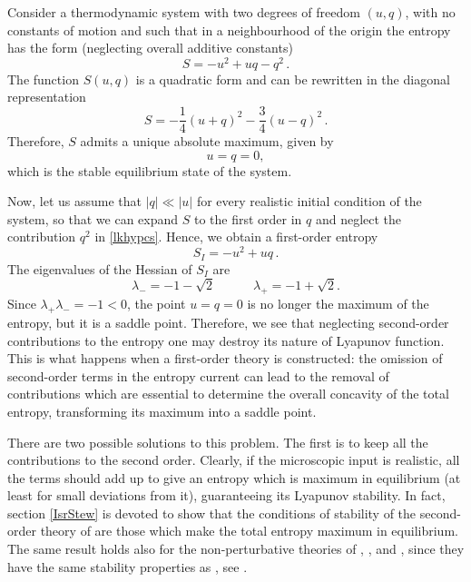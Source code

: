 \documentclass[a4paper, amsfonts, amssymb, amsmath, reprint, showkeys, nofootinbib, twoside]{revtex4-1}
\newcommand{\spc}{\quad \quad \quad}
\begin{document}
Consider a thermodynamic system with two degrees of freedom $(u,q)$, with no constants of motion and such that in a neighbourhood of the origin the entropy has the form (neglecting overall additive constants)
%
\begin{equation}\label{lkhypcs}
S = -u^2  +uq -q^2 \, .
\end{equation}
%
The function $S(u,q)$ is a quadratic form and can be rewritten in the diagonal representation
\begin{equation}
S = -\dfrac{1}{4} (u+q)^2 - \dfrac{3}{4}(u-q)^2 \, .
\end{equation} 
Therefore, $S$ admits a unique absolute maximum, given by
\begin{equation}
u=q=0,
\end{equation}
which is the stable equilibrium state of the system. 

Now,  let us assume  that  $|q| \ll |u|$ for every realistic initial condition of the system, 
so that we can expand $S$ to the first order in $q$ and neglect the contribution $q^2$ in \eqref{lkhypcs}. 
Hence, we obtain a first-order entropy
\begin{equation}
S_I = -u^2  +uq \, .
\end{equation}
The eigenvalues of the Hessian of $S_I $ are
\begin{equation}
\lambda_- =-1-\sqrt{2}  \spc  \lambda_+ = -1+\sqrt{2}.
\end{equation}
Since $\lambda_+ \lambda_- = -1<0$, the point $u=q=0$ is no longer the maximum of the entropy, but it is a saddle point. Therefore, we see that neglecting second-order contributions to the entropy one may destroy its nature of Lyapunov function. This is what happens when a first-order theory is constructed: the omission of second-order terms in the entropy current can lead to the removal of  contributions which are essential to determine the overall concavity of the total entropy, transforming its maximum into a saddle point.

There are two possible solutions to this problem. The first is to keep all the contributions to the second order. Clearly, if the microscopic input is realistic, all the terms should add up to give an entropy which is maximum in equilibrium (at least for small deviations from it), guaranteeing its Lyapunov stability. 
In fact, section \ref{IsrStew} is devoted to show that the conditions of stability of the second-order theory of \citet{Israel_Stewart_1979} are those which make the total entropy maximum in equilibrium. The same result holds also for the non-perturbative theories of \citet{carter1991}, \citet{lopez2011}, and \citet{BulkGavassino}, since they have the same stability properties as \cite{Israel_Stewart_1979}, see \cite{Priou1991}.
\end{document}
